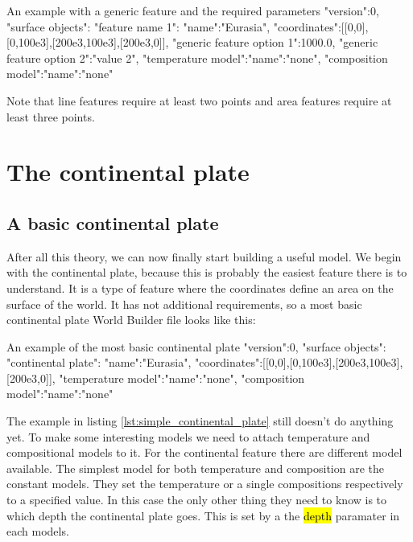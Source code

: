 \documentclass{book}
\newcommand{\WB}{{World Builder}}
\begin{document}
\begin{bashcode}{An example with a generic feature and the required parameters}
"version":0,
"surface objects":
{
  "feature name 1":
  {
    "name":"Eurasia",
    "coordinates":[[0,0],[0,100e3],[200e3,100e3],[200e3,0]],
    "generic feature option 1":1000.0, 
    "generic feature option 2":"value 2",
    "temperature model":{"name":"none"},
    "composition model":{"name":"none"}
  }
}
\end{bashcode}

\begin{remark}
Note that line features require at least two points and area features require at least three points.
\end{remark}

\section{The continental plate}
\label{section:continetnal_plate}
\subsection{A basic continental plate}
After all this theory, we can now finally start building a useful model. We begin with the continental plate, because this is probably the easiest feature there is to understand. It is a type of feature where the coordinates define an area on the surface of the world. It has not additional requirements, so a most basic continental plate \WB{} file looks like this:

\begin{bashcode}[label=lst:simple_continental_plate]{An example of the most basic continental plate}
"version":0,
"surface objects":
{
  "continental plate":
  {
    "name":"Eurasia",
    "coordinates":[[0,0],[0,100e3],[200e3,100e3],[200e3,0]],
    "temperature model":{"name":"none"},
    "composition model":{"name":"none"}
  }
}
\end{bashcode}

The example in listing \ref{lst:simple_continental_plate} still doesn't do anything yet. To make some interesting models we need to attach temperature and compositional models to it. For the continental feature there are different model available. The simplest model for both temperature and composition are the constant models. They set the temperature or a single compositions respectively to a specified value. In this case the only other thing they need to know is to which depth the continental plate goes. This is set by a the \hl{depth} paramater in each models.
\end{document}
